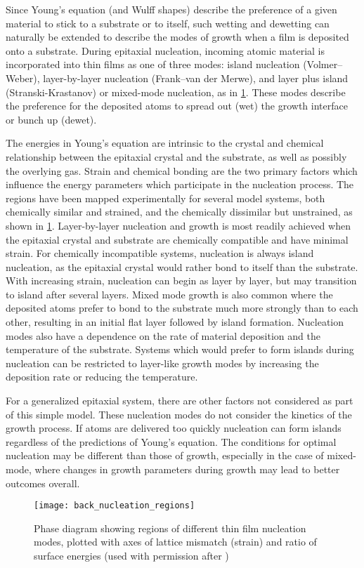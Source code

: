 Since Young's equation (and Wulff shapes) describe the preference of a given material to stick to a substrate or to itself, such wetting and dewetting can naturally be extended to describe the modes of growth when a film is deposited onto a substrate.
During epitaxial nucleation, incoming atomic material is incorporated into thin films as one of three modes: island nucleation (Volmer–Weber), layer-by-layer nucleation (Frank–van der Merwe), and layer plus island (Stranski-Krastanov) or mixed-mode nucleation\cite{Venables1984}, as in \cref{fig:back_nucleation_regions}.
These modes describe the preference for the deposited atoms to spread out (wet) the growth interface or bunch up (dewet).

The energies in Young's equation are intrinsic to the crystal and chemical relationship between the epitaxial crystal and the substrate, as well as possibly the overlying gas.
Strain and chemical bonding are the two primary factors which influence the energy parameters which participate in the nucleation process.
The regions have been mapped experimentally for several model systems, both chemically similar and strained, and the chemically dissimilar but unstrained, as shown in \cref{fig:back_nucleation_regions}.
Layer-by-layer nucleation and growth is most readily achieved when the epitaxial crystal and substrate are chemically compatible and have minimal strain\cite{Venables1984}.
For chemically incompatible systems, nucleation is always island nucleation, as the epitaxial crystal would rather bond to itself than the substrate.
With increasing strain, nucleation can begin as layer by layer, but may transition to island after several layers.
Mixed mode growth is also common where the deposited atoms prefer to bond to the substrate much more strongly than to each other, resulting in an initial flat layer followed by island formation\cite{Venables1984}.
Nucleation modes also have a dependence on the rate of material deposition and the temperature of the substrate.
Systems which would prefer to form islands during nucleation can be restricted to layer-like growth modes by increasing the deposition rate or reducing the temperature.

For a generalized epitaxial system, there are other factors not considered as part of this simple model.
These nucleation modes do not consider the kinetics of the growth process.
If atoms are delivered too quickly nucleation can form islands regardless of the predictions of Young's equation.
The conditions for optimal nucleation may be different than those of growth, especially in the case of mixed-mode, where changes in growth parameters during growth may lead to better outcomes overall.
\begin{figure}
 \centering \texttt{[image: back\_nucleation\_regions]}
 \caption[Nucleation phase diagram of surface energy and strain]{\label{fig:back_nucleation_regions}Phase diagram showing regions of different thin film nucleation modes, plotted with axes of lattice mismatch (strain) and ratio of surface energies (used with permission after \cite{ohring2001materials})}
\end{figure}

